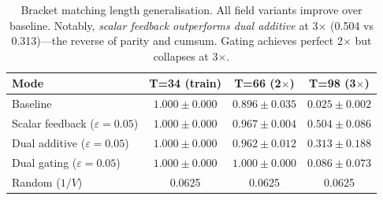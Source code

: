 \documentclass[11pt,a4paper]{article}
\begin{document}
\begin{table}[h]
\centering
\begin{tabular}{@{}lccc@{}}
\toprule
\textbf{Mode} & \textbf{T=34 (train)} & \textbf{T=66 (2$\times$)}
& \textbf{T=98 (3$\times$)} \\
\midrule
Baseline & $1.000 \pm 0.000$ & $0.896 \pm 0.035$
& $0.025 \pm 0.002$ \\
Scalar feedback ($\varepsilon\!=\!0.05$) & $1.000 \pm 0.000$
& $\mathbf{0.967 \pm 0.004}$ & $\mathbf{0.504 \pm 0.086}$ \\
Dual additive ($\varepsilon\!=\!0.05$) & $1.000 \pm 0.000$
& $0.962 \pm 0.012$ & $0.313 \pm 0.188$ \\
Dual gating ($\varepsilon\!=\!0.05$) & $1.000 \pm 0.000$
& $1.000 \pm 0.000$ & $0.086 \pm 0.073$ \\
\addlinespace
Random ($1/V$) & 0.0625 & 0.0625 & 0.0625 \\
\bottomrule
\end{tabular}
\caption{Bracket matching length generalisation.  All field variants
improve over baseline.  Notably, \emph{scalar feedback outperforms
dual additive} at 3$\times$ (0.504 vs 0.313)---the reverse of
parity and cumsum.  Gating achieves perfect 2$\times$ but collapses
at 3$\times$.}
\label{tab:brackets}
\end{table}
\end{document}
